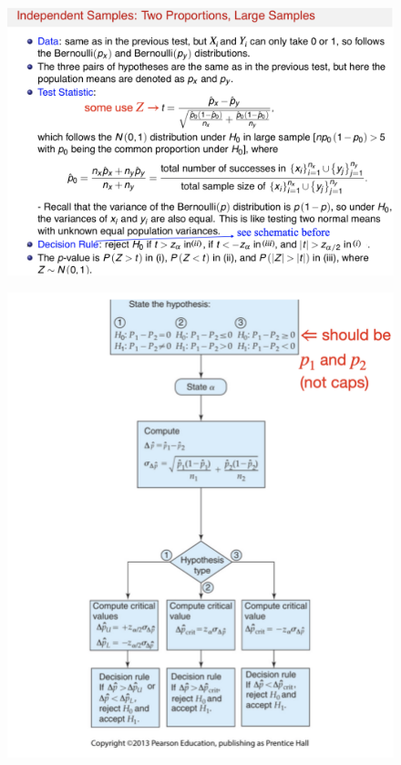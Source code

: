 \documentclass[14pt]{extarticle}
\begin{document}
\begin{figure}[H]
    \centering
    \includegraphics[width=1\textwidth]{fig25.png}
\end{figure}

\begin{figure}[H]
    \centering
    \includegraphics[width=1\textwidth]{fig26.png}
\end{figure}
\end{document}
